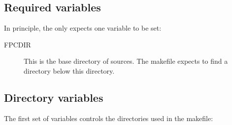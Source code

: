 \documentclass{report}
\begin{document}
\subsection{Required variables}

In principle, the  only expects one variable to be set:
\begin{description}
\item[FPCDIR] This is the base directory of \fpc sources. The makefile
expects to find a directory  below this directory.
\end{description}

\subsection{Directory variables}

The first set of variables controls the directories used in the makefile:
\end{document}

